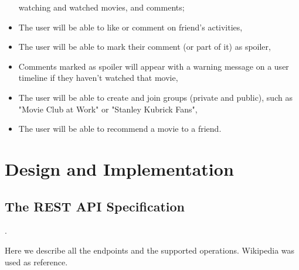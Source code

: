 \begin{itemize}
    watching and watched movies, and comments;
  \item The user will be able to like or comment on friend's activities,
  \item The user will be able to mark their comment (or part of it) as spoiler,
  \item Comments marked as spoiler will appear with a warning message on a user
    timeline if they haven't watched that movie,
  \item The user will be able to create and join groups (private and public),
    such as "Movie Club at Work" or "Stanley Kubrick Fans",
  \item The user will be able to recommend a movie to a friend.
\end{itemize}

\section{Design and Implementation}

\subsection{The REST API Specification} \label{sec:endpoints}.

Here we describe all the endpoints and the supported operations.
Wikipedia\cite{wikipediarest} was used as reference.

